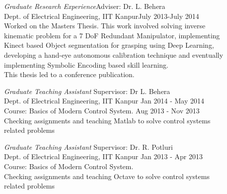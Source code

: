 \documentclass[margin,line]{resume}
\begin{document}
\begin{resume}
    
    \emph{Graduate Research Experience}\hfill Adviser: Dr. L. Behera\\
    Dept. of Electrical Engineering, IIT Kanpur\hfill July 2013-July 2014\\
    Worked on the Masters Thesis. This work involved solving inverse \\kinematic problem for a 7 DoF Redundant Manipulator, implementing \\Kinect based Object segmentation for grasping using Deep Learning, \\developing a hand-eye autonomous calibration technique and eventually\\ implementing Symbolic Encoding based skill learning. \\This thesis led to a conference publication. 
    
   \emph{Graduate Teaching Assistant} \hfill Supervisor: Dr L. Behera\\
   Dept. of Electrical Engineering, IIT Kanpur \hfill Jan 2014 - May 2014\\
   Course: Basics of Modern Control System. \hfill Aug 2013 - Nov 2013\\
   Checking assignments and teaching Matlab to solve control systems\\ related problems

    \emph{Graduate Teaching Assistant} \hfill Supervisor: Dr. R. Potluri\\
   Dept. of Electrical Engineering, IIT Kanpur \hfill Jan 2013 - Apr 2013\\
   Course: Basics of Modern Control System. \\
   Checking assignments and teaching Octave to solve control systems\\ related problems


    \vspace{-2mm}


\end{resume}
\end{document}
